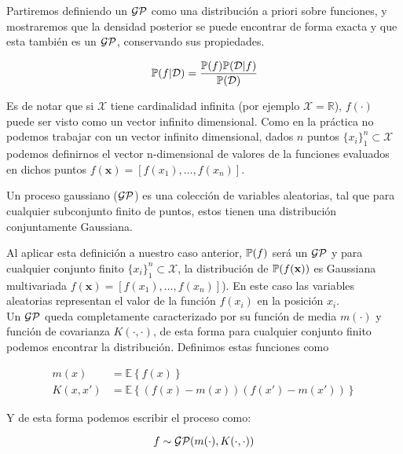 Partiremos definiendo un $\mathcal{GP}$ como una distribución a priori sobre funciones, y mostraremos que la densidad posterior se puede encontrar de forma exacta y que esta también es un $\mathcal{GP}$, conservando sus propiedades.

\begin{equation}
	\mathbb{P}(f|\mathcal{D}) =  \frac{\mathbb{P}(f)\mathbb{P}(\mathcal{D}|f)}{\mathbb{P}(\mathcal{D})}
\end{equation}

Es de notar que si $\mathcal{X}$ tiene cardinalidad infinita (por ejemplo $\mathcal{X}=\mathbb{R}$), $f(\cdot)$ puede ser visto como un vector infinito dimensional. Como en la práctica no podemos trabajar con un vector infinito dimensional, dados $n$ puntos $\{ x_i\}_{1}^{n}  \subset \mathcal{X}$ podemos definirnos el vector n-dimensional de valores de la funciones evaluados en dichos puntos $f(\mathbf{x})=[f(x_1), \ldots, f(x_n)]$.\\


\begin{definition}
	Un proceso gaussiano ($\mathcal{GP}$) es una colección de variables aleatorias, tal que para cualquier subconjunto finito de puntos, estos tienen una distribución conjuntamente Gaussiana.
\end{definition}


Al aplicar esta definición a nuestro caso anterior, $\mathbb{P}(f)$ será un $\mathcal{GP}$ y para cualquier conjunto finito $\{ x_i\}_{1}^{n}  \subset \mathcal{X}$, la distribución de $\mathbb{P}(f(\mathbf{x}))$ es Gaussiana multivariada $f(\mathbf{x})=[f(x_1), \ldots, f(x_n)]$). En este caso las variables aleatorias representan el valor de la función $f(x_i)$ en la posición $x_i$.\\


Un $\mathcal{GP}$ queda completamente caracterizado por su función de media $m(\cdot)$ y función de covarianza $K(\cdot, \cdot)$, de esta forma para cualquier conjunto finito podemos encontrar la distribución. Definimos estas funciones como

\begin{align}
	m(x) & = \mathbb{E}\left\{f(x)\right\}\\
	K(x, x') & = \mathbb{E}\left\{\left(f(x) - m(x)\right) \left(f(x') - m(x') \right)\right\}
\end{align}

Y de esta forma podemos escribir el proceso como:

\begin{equation}
	f \sim \mathcal{GP}(m(\cdot), K(\cdot, \cdot))
\end{equation}

